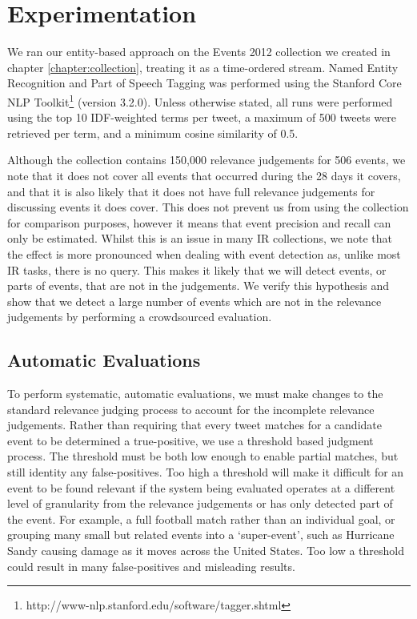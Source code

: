 
\section{Experimentation}
\label{detection:sec:experimentation}
We ran our entity-based approach on the Events 2012 collection we created in chapter \ref{chapter:collection}, treating it as a time-ordered stream.
Named Entity Recognition and Part of Speech Tagging was performed using the Stanford Core NLP Toolkit\footnote{http://www-nlp.stanford.edu/software/tagger.shtml} (version 3.2.0).
Unless otherwise stated, all runs were performed using the top 10 IDF-weighted terms per tweet, a maximum of 500 tweets were retrieved per term, and a minimum cosine similarity of 0.5.

Although the collection contains 150,000 relevance judgements for 506 events, we note that it does not cover all events that occurred during the 28 days it covers, and that it is also likely that it does not have full relevance judgements for discussing events it does cover.
This does not prevent us from using the collection for comparison purposes, however it means that event precision and recall can only be estimated.
Whilst this is an issue in many IR collections, we note that the effect is more pronounced when dealing with event detection as, unlike most IR tasks, there is no query.
This makes it likely that we will detect events, or parts of events, that are not in the judgements.
We verify this hypothesis and show that we detect a large number of events which are not in the relevance judgements by performing a crowdsourced evaluation.

\subsection{Automatic Evaluations}
To perform systematic, automatic evaluations, we must make changes to the standard relevance judging process to account for the incomplete relevance judgements.
Rather than requiring that every tweet matches for a candidate event to be determined a true-positive, we use a threshold based judgment process.
The threshold must be both low enough to enable partial matches, but still identity any false-positives.
Too high a threshold will make it difficult for an event to be found relevant if the system being evaluated operates at a different level of granularity from the relevance judgements or has only detected part of the event.
For example, a full football match rather than an individual goal, or grouping many small but related events into a `super-event', such as Hurricane Sandy causing damage as it moves across the United States.
Too low a threshold could result in many false-positives and misleading results.

